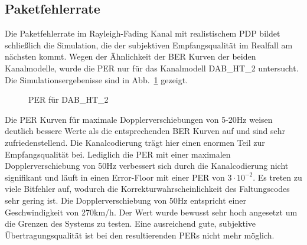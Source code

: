 \subsection{Paketfehlerrate}
Die Paketfehlerrate im Rayleigh-Fading Kanal mit realistischem PDP bildet schließlich die Simulation, die der subjektiven Empfangsqualität im Realfall am nächsten kommt. Wegen der Ähnlichkeit der BER Kurven der beiden Kanalmodelle, wurde die PER nur für das Kanalmodell DAB\_HT\_2 untersucht. Die Simulationsergebenisse sind in Abb.~\ref{plot:doppler_per} gezeigt.

\begin{figure}[htb]
\begin{center}
\end{center}
\caption{PER für DAB\_HT\_2}
\label{plot:doppler_per}
\end{figure}

Die PER Kurven für maximale Dopplerverschiebungen von 5-20Hz weisen deutlich bessere Werte als die entsprechenden BER Kurven auf und sind sehr zufriedenstellend. Die Kanalcodierung trägt hier einen enormen Teil zur Empfangsqualität bei. Lediglich die PER mit einer maximalen Dopplerverschiebung von 50Hz verbessert sich durch die Kanalcodierung nicht signifikant und läuft in einen Error-Floor mit einer PER von $3 \cdot 10^{-2}$. Es treten zu viele Bitfehler auf, wodurch die Korrekturwahrscheinlichkeit des Faltungscodes sehr gering ist. Die Dopplerverschiebung von 50Hz entspricht einer Geschwindigkeit von 270km/h. Der Wert wurde bewusst sehr hoch angesetzt um die Grenzen des Systems zu testen. Eine ausreichend gute, subjektive Übertragungsqualität ist bei den resultierenden PERs nicht mehr möglich.